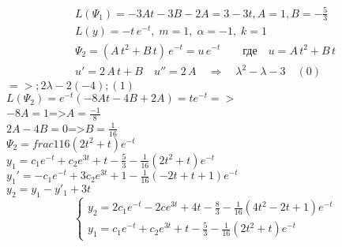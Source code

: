 \begin{Example}
    \begin{align*}
        L(\Psi_1)=-3At-3B-2A=3-3t, A=1, B=-\frac{5}{3}\\
        L(y)=-t\,e^{-t},\; m=1,\; \alpha=-1,\; k=1\\
        \Psi_2 = (A\,t^2+B\,t)\,e^{-t} = u\,e^{-t} \qquad \text{где} \quad u=A\,t^2+B\,t\\
        u'=2\,A\,t+B \quad u''= 2\,A \quad \Rightarrow \quad \lambda^2-\lambda-3 \quad (0)
    \end{align*}
    $=>;2\lambda-2(-4);(1)$\\
$L(\Psi_2)=e^{-t}(-8At-4B+2A)=te^{-t}=>$\\
$-8A=1$=>$A=\frac{-1}{8}$\\
$2A-4B=0$=>$B=\frac{1}{16}$\\
$\Psi_2=frac{1}{16}(2t^2+t)e^{-t}$\\
$y_1=c_1e^{-t}+c_2e^{3t}+t-\frac{5}{3}-\frac{1}{16}(2t^2+t)e^{-t}$\\
$y_1'=-c_1e^{-t}+3c_2e^{3t}+1-\frac{1}{16}(-2t+t+1)e^{-t}$\\
$y_2=y_1-y'_1+3t$\\
    \[
    \begin{cases}
        y_2=2c_1e^{-t}-2ce^{3t}+4t-\frac{8}{3}-\frac{1}{16}(4t^2-2t+1)e^{-t}\\
        y_1=c_1e^{-t}+c_2e^{3t}+t-\frac{5}{3}-\frac{1}{16}(2t^2+t)e^{-t}
        \end{cases}
    \]
\end{Example}
